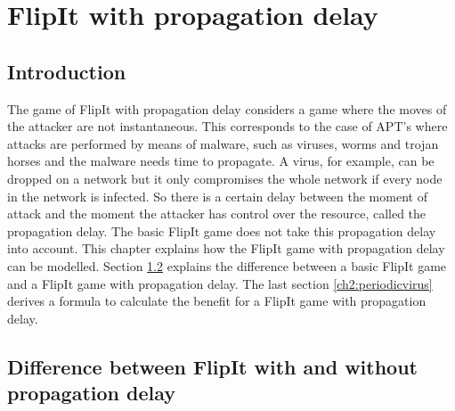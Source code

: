\chapter{FlipIt with propagation delay}
\label{chapter2:FlipIt with virus propagation}
%


\section{Introduction}
\label{Ch2:Intro}
The game of FlipIt with propagation delay considers a game where the moves of the attacker are not instantaneous. This corresponds to the case of APT's where attacks are performed by means of malware, such as viruses, worms and trojan horses and the malware needs time to propagate. A virus, for example, can be dropped on a network but it only compromises the whole network if every node in the network is infected. So there is a certain delay between the moment of attack and the moment the attacker has control over the resource, called the propagation delay. The basic FlipIt game does not take this propagation delay into account. This chapter explains how the FlipIt game with propagation delay can be modelled. Section \ref{ch2:diffFlip} explains the difference between a basic FlipIt game and a FlipIt game with propagation delay. The last section \ref{ch2:periodicvirus} derives a formula to calculate the benefit for a FlipIt game with propagation delay. 
%
%
%

\section{Difference between FlipIt with and without propagation delay}
\label{ch2:diffFlip}

